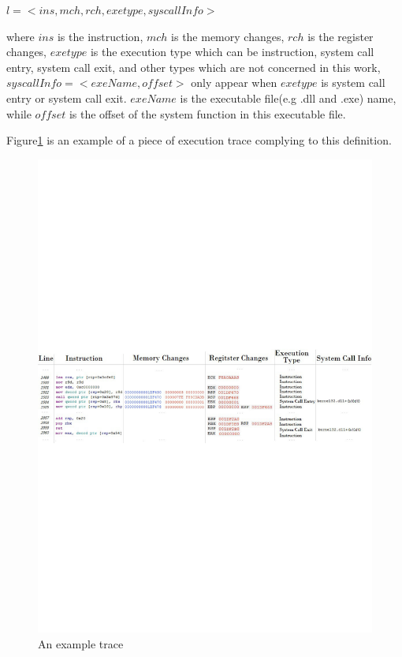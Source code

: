 $l = <ins, mch, rch, exetype, syscallInfo>$

where $ins$ is the instruction, $mch$ is the memory changes, $rch$ is the register changes, $exetype$ is the execution type which can be instruction, system call entry, system call exit, and other types which are not concerned in this work, $syscallInfo = <exeName, offset>$ only appear when $exetype$ is system call entry or system call exit. $exeName$ is the executable file(e.g .dll and .exe) name, while $offset$ is the offset of the system function in this executable file.

Figure\ref{trace} is an example of a piece of execution trace complying to this definition. 

\begin{figure}[H]
\centerline{\includegraphics[scale=0.5]{Figures/trace}}
\caption{An example trace }
\label{trace}
\end{figure}

